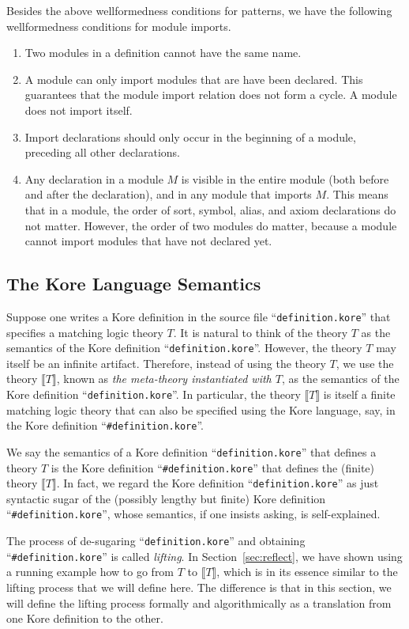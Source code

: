 \documentclass[UTF8,11pt]{article}
\theoremstyle{plain}
\theoremstyle{definition}
\theoremstyle{remark}
\newcommand{\Bracket}[1]{\llbracket#1\rrbracket}
\begin{document}
Besides the above wellformedness conditions for patterns, we have the following 
wellformedness conditions for module imports.
\begin{enumerate} \itemsep0em
\item Two modules in a definition cannot have the same name.
\item A module can only import modules that are have been declared. This 
guarantees that the module import relation does not form a cycle. A module does 
not import itself.
\item Import declarations should only occur in the beginning of a module, 
preceding all other declarations.
\item Any declaration in a module $M$ is visible in the entire module (both 
before and after the declaration), and in any module that imports $M$. This 
means that in a module, the order of sort, symbol, alias, and axiom 
declarations do not matter. However, the order of two modules do matter, 
because a module cannot import modules that have not declared yet.
\end{enumerate}


\subsection{The Kore Language Semantics}
\label{sec:kore-semantics}
Suppose one writes a Kore definition in the source file 
``\verb|definition.kore|''
that specifies a matching logic theory $T$.
It is natural to think of the theory $T$ as the semantics of the Kore 
definition ``\verb|definition.kore|''.
However, the theory $T$ may itself be an infinite artifact.
Therefore, instead of using the theory $T$, we use the theory $\Bracket{T}$, 
known as \emph{the meta-theory instantiated with $T$},
as the semantics of the Kore definition 
``\verb|definition.kore|''.
In particular, the theory $\Bracket{T}$ is itself a finite matching logic 
theory that can also be specified using the Kore language, say, in the Kore 
definition
``\verb|#definition.kore|''.

We say the semantics of a Kore definition ``\verb|definition.kore|'' that 
defines a theory $T$ is the Kore definition ``\verb|#definition.kore|'' that 
defines the (finite) theory $\Bracket{T}$.
In fact, we regard the Kore definition ``\verb|definition.kore|'' as just 
syntactic sugar of the (possibly lengthy but finite) Kore definition 
``\verb|#definition.kore|'', whose semantics, if one insists asking, is 
self-explained.

The process of de-sugaring ``\verb|definition.kore|'' and obtaining 
``\verb|#definition.kore|'' is called \emph{lifting}.
In Section~\ref{sec:reflect}, we have shown using a running example how to go 
from $T$ to $\Bracket{T}$, which is in its essence similar to the lifting 
process that we will define here.
The difference is that in this section, we will define the lifting process 
formally and algorithmically as a translation from one Kore definition to the 
other.
\end{document}
